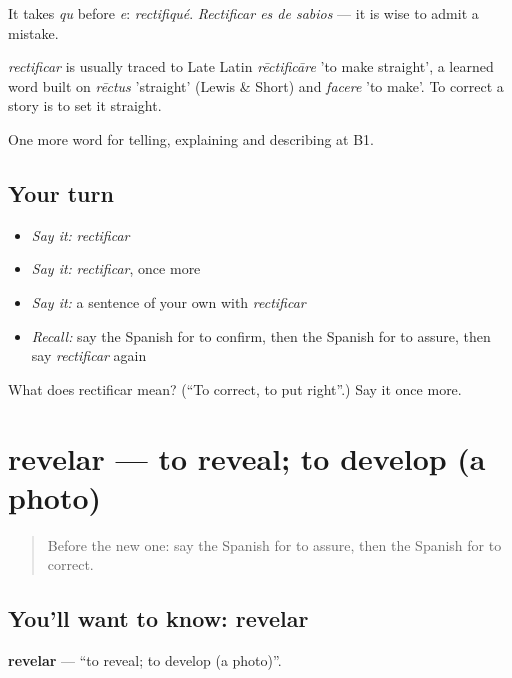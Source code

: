 It takes \emph{qu} before \emph{e}: \emph{rectifiqué}. \emph{Rectificar es de sabios} — it is wise to admit a mistake.

\begin{cousinweb}
\emph{rectificar} is usually traced to Late Latin \emph{rēctificāre} 'to make straight', a learned word built on \emph{rēctus} 'straight' (Lewis \& Short) and \emph{facere} 'to make'. To correct a story is to set it straight.
\end{cousinweb}

\begin{grammarlens}[title={What you've built}]
One more word for telling, explaining and describing at B1.
\end{grammarlens}

\subsection*{Your turn}
\begin{itemize}
\raggedright
  \item \emph{Say it:} \emph{rectificar}
  \item \emph{Say it:} \emph{rectificar}, once more
  \item \emph{Say it:} a sentence of your own with \emph{rectificar}
  \item \emph{Recall:} say the Spanish for to confirm, then the Spanish for to assure, then say \emph{rectificar} again
\end{itemize}

\begin{tcolorbox}[breakable,colback=teal!4,colframe=teal!35!black,title={Before you move on}]
What does rectificar mean? (\textquotedblleft{}To correct, to put right\textquotedblright{}.) Say it once more.
\end{tcolorbox}
\section[revelar]{revelar — to reveal; to develop (a photo)}

\label{lesson:ES-C516-revelar}



\begin{quote}
Before the new one: say the Spanish for to assure, then the Spanish for to correct.
\end{quote}

\subsection*{You'll want to know: revelar}
\textbf{revelar} — \textquotedblleft{}to reveal; to develop (a photo)\textquotedblright{}.

